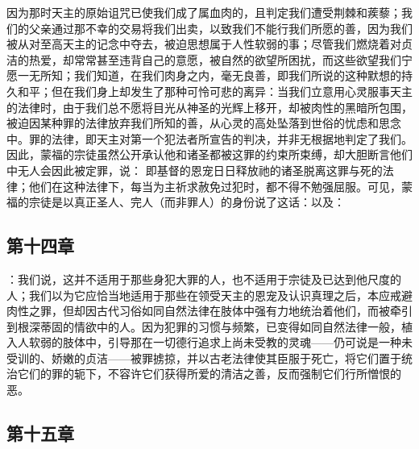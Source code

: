 因为那时天主的原始诅咒已使我们成了属血肉的，且判定我们遭受荆棘和蒺藜；我们的父亲通过那不幸的交易将我们出卖，以致我们不能行我们所愿的善，因为我们被从对至高天主的记念中夺去，被迫思想属于人性软弱的事；尽管我们燃烧着对贞洁的热爱，却常常甚至违背自己的意愿，被自然的欲望所困扰，而这些欲望我们宁愿一无所知；我们知道，在我们肉身之内，毫无良善，即我们所说的这种默想的持久和平；但在我们身上却发生了那种可怜可悲的离异：当我们立意用心灵服事天主的法律时，由于我们总不愿将目光从神圣的光辉上移开，却被肉性的黑暗所包围，被迫因某种罪的法律放弃我们所知的善，从心灵的高处坠落到世俗的忧虑和思念中。罪的法律，即天主对第一个犯法者所宣告的判决，并非无根据地判定了我们。因此，蒙福的宗徒虽然公开承认他和诸圣都被这罪的约束所束缚，却大胆断言他们中无人会因此被定罪，说： 即基督的恩宠日日释放祂的诸圣脱离这罪与死的法律；他们在这种法律下，每当为主祈求赦免过犯时，都不得不勉强屈服。可见，蒙福的宗徒是以真正圣人、完人（而非罪人）的身份说了这话：以及：\par


\subsection{第十四章}

\par

：我们说，这并不适用于那些身犯大罪的人，也不适用于宗徒及已达到他尺度的人；我们以为它应恰当地适用于那些在领受天主的恩宠及认识真理之后，本应戒避肉性之罪，但却因古代习俗如同自然法律在肢体中强有力地统治着他们，而被牵引到根深蒂固的情欲中的人。因为犯罪的习惯与频繁，已变得如同自然法律一般，植入人软弱的肢体中，引导那在一切德行追求上尚未受教的灵魂——仍可说是一种未受训的、娇嫩的贞洁——被罪掳掠，并以古老法律使其臣服于死亡，将它们置于统治它们的罪的轭下，不容许它们获得所爱的清洁之善，反而强制它们行所憎恨的恶。\par


\subsection{第十五章}

